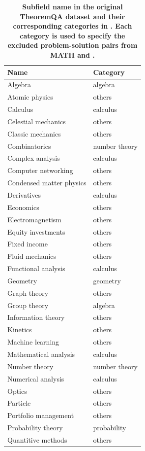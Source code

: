 \begin{table}
\caption{
    \textbf{Subfield name in the original TheoremQA dataset and their corresponding categories in \ours. Each category is used to specify the excluded problem-solution pairs from MATH and \aops.}
}
\centering
\begin{tabular}{ll}
    \toprule
    Name & Category \\
    \midrule
    Algebra & algebra \\
    Atomic physics & others \\
    Calculus & calculus \\
    Celestial mechanics & others \\
    Classic mechanics & others \\
    Combinatorics & number theory \\
    Complex analysis & calculus \\
    Computer networking & others \\
    Condensed matter physics & others \\
    Derivatives & calculus \\
    Economics & others \\
    Electromagnetism & others \\
    Equity investments & others \\
    Fixed income & others \\
    Fluid mechanics & others \\
    Functional analysis & calculus \\
    Geometry & geometry \\
    Graph theory & others \\
    Group theory & algebra \\
    Information theory & others \\
    Kinetics & others \\
    Machine learning & others \\
    Mathematical analysis & calculus \\
    Number theory & number theory \\
    Numerical analysis & calculus \\
    Optics & others \\
    Particle & others \\
    Portfolio management & others \\
    Probability theory & probability \\
    Quantitive methods & others \\

\end{tabular}
\end{table}
